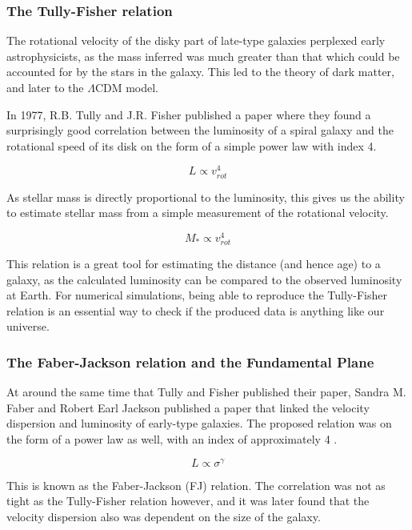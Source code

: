 \subsubsection{The Tully-Fisher relation}
The rotational velocity of the disky part of late-type galaxies perplexed early astrophysicists, as the mass inferred was much greater than that which could be accounted for by the stars in the galaxy. This led to the theory of dark matter, and later to the $\Lambda$CDM model.

In 1977, R.B. Tully and J.R. Fisher \parencite{TullyFisher1977} published a paper where they found a surprisingly good correlation between the luminosity of a spiral galaxy and the rotational speed of its disk on the form of a simple power law with index 4.

\begin{equation}
    L \propto v_{rot}^4 
\end{equation}

As stellar mass is directly proportional to the luminosity, this gives us the ability to estimate stellar mass from a simple measurement of the rotational velocity.

\begin{equation}
    M_* \propto v_{rot}^4 
\end{equation}

This relation is a great tool for estimating the distance (and hence age) to a galaxy, as the calculated luminosity can be compared to the observed luminosity at Earth. For numerical simulations, being able to reproduce the Tully-Fisher relation is an essential way to check if the produced data is anything like our universe.

\subsubsection{The Faber-Jackson relation and the Fundamental Plane}
At around the same time that Tully and Fisher published their paper, Sandra M. Faber and Robert Earl Jackson published a paper that linked the velocity dispersion and luminosity of early-type galaxies. The proposed relation was on the form of a power law as well, with an index of approximately 4 \parencite{FaberJackson1976}.

\begin{equation}
    L \propto \sigma^{\gamma} 
\end{equation}

This is known as the Faber-Jackson (FJ) relation. The correlation was not as tight as the Tully-Fisher relation however, and it was later found that the velocity dispersion also was dependent on the size of the galaxy.

